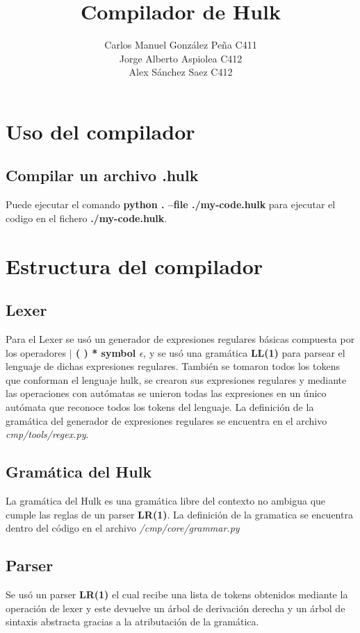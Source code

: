 \documentclass[12pt]{article}
\begin{document}
\title{Compilador de Hulk}
\author{Carlos Manuel González Peña C411 \\ Jorge Alberto Aspiolea C412 \\ Alex Sánchez Saez C412}
\maketitle

\section{Uso del compilador}
\subsection{Compilar un archivo .hulk}
Puede ejecutar el comando \textbf{python . --file ./my-code.hulk} para ejecutar el codigo en el fichero \textbf{./my-code.hulk}.


\section{Estructura del compilador}
\subsection{Lexer}
Para el Lexer se usó un generador de expresiones regulares básicas compuesta por los operadores \textbf{$|$ ( ) * symbol $\epsilon$}, y se usó una gramática \textbf{LL(1)} para parsear el lenguaje de dichas expresiones regulares.
También se tomaron todos los tokens que conforman el lenguaje hulk, se crearon sus expresiones regulares y mediante las operaciones con autómatas se unieron todas las expresiones en un único autómata que reconoce todos los tokens del lenguaje.
La definición de la gramática del generador de expresiones regulares se encuentra en el archivo \textit{cmp/tools/regex.py}.

\subsection{Gramática del Hulk}
La gramática del Hulk es una gramática libre del contexto no ambigua que cumple las reglas de un parser \textbf{LR(1)}. La definición de la gramatica se encuentra dentro del código en el archivo \textit{/cmp/core/grammar.py}

\subsection{Parser}
Se usó un parser \textbf{LR(1)} el cual recibe una lista de tokens obtenidos mediante la operación de lexer y este devuelve un árbol de derivación derecha y un árbol de sintaxis abstracta gracias a la atributación de la gramática.
\end{document}
